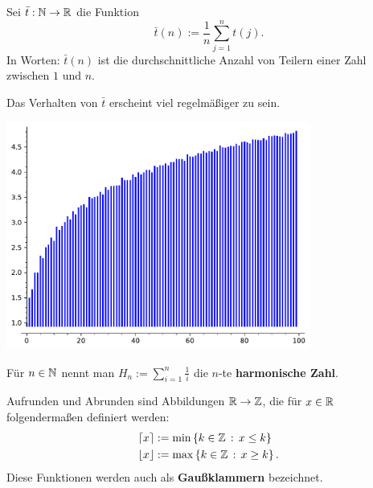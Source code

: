 \begin{defn}
	Sei $\bar{t} : \mathbb{N} \to \mathbb{R}$ die Funktion
	\[
			\bar{t} (n) := \frac{1}{n} \sum_{j=1}^n t(j).
	\]
	In Worten: $\bar{t} (n)$ ist die durchschnittliche Anzahl von Teilern einer Zahl zwischen $1$ und $n$.
\end{defn} 

\begin{bem}
	Das Verhalten von $\bar{t}$ erscheint viel regelmäßiger zu sein. 
	\begin{center}
	\includegraphics[width=10cm]{Pics/t_bar_plot.pdf}
\end{center} 
\end{bem} 

\begin{defn}
	Für $n \in \mathbb{N}$ nennt man $H_n := \sum\limits_{i=1}^n \frac{1}{i}$ die $n$-te \textbf{harmonische Zahl}. 
\end{defn} 

\begin{defn}
	Aufrunden und Abrunden sind Abbildungen $\mathbb{R} \to \mathbb{Z}$, die für $x \in \mathbb{R}$ folgendermaßen definiert werden: 
	\begin{align*}
			\left\lceil x \right\rceil & := \min \left\{ k \in \mathbb{Z} \,:\, x \le k \right\}
			\\ \left\lfloor x \right\rfloor & := \max \left\{ k \in \mathbb{Z} \,:\, x \ge k \right\}. 
	\end{align*}
	Diese Funktionen werden auch als \textbf{Gau\ss klammern} bezeichnet.
\end{defn} 


